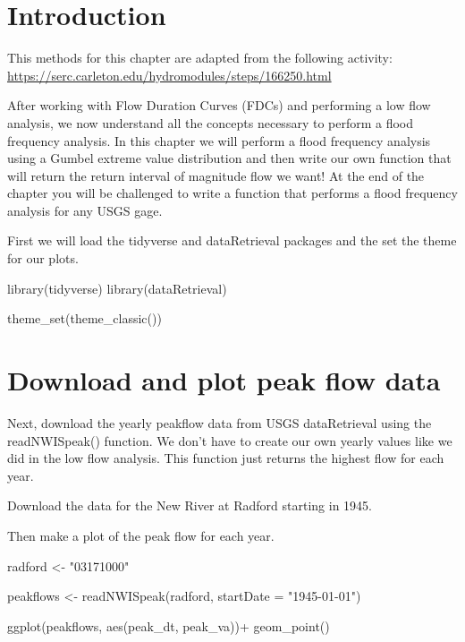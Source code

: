 \documentclass[
]{book}
\newenvironment{Shaded}{\begin{snugshade}}{\end{snugshade}}
\newcommand{\AttributeTok}[1]{\textcolor[rgb]{0.77,0.63,0.00}{#1}}
\newcommand{\FunctionTok}[1]{\textcolor[rgb]{0.00,0.00,0.00}{#1}}
\newcommand{\NormalTok}[1]{#1}
\newcommand{\OtherTok}[1]{\textcolor[rgb]{0.56,0.35,0.01}{#1}}
\newcommand{\SpecialCharTok}[1]{\textcolor[rgb]{0.00,0.00,0.00}{#1}}
\newcommand{\StringTok}[1]{\textcolor[rgb]{0.31,0.60,0.02}{#1}}
\begin{document}
\hypertarget{introduction-2}{%
\section{Introduction}\label{introduction-2}}

This methods for this chapter are adapted from the following activity:
\url{https://serc.carleton.edu/hydromodules/steps/166250.html}

After working with Flow Duration Curves (FDCs) and performing a low flow analysis, we now understand all the concepts necessary to perform a flood frequency analysis. In this chapter we will perform a flood frequency analysis using a Gumbel extreme value distribution and then write our own function that will return the return interval of magnitude flow we want! At the end of the chapter you will be challenged to write a function that performs a flood frequency analysis for any USGS gage.

First we will load the tidyverse and dataRetrieval packages and the set the theme for our plots.

\begin{Shaded}
\begin{Highlighting}[]
\FunctionTok{library}\NormalTok{(tidyverse)}
\FunctionTok{library}\NormalTok{(dataRetrieval)}

\FunctionTok{theme\_set}\NormalTok{(}\FunctionTok{theme\_classic}\NormalTok{())}
\end{Highlighting}
\end{Shaded}

\hypertarget{download-and-plot-peak-flow-data}{%
\section{Download and plot peak flow data}\label{download-and-plot-peak-flow-data}}

Next, download the yearly peakflow data from USGS dataRetrieval using the readNWISpeak() function. We don't have to create our own yearly values like we did in the low flow analysis. This function just returns the highest flow for each year.

Download the data for the New River at Radford starting in 1945.

Then make a plot of the peak flow for each year.

\begin{Shaded}
\begin{Highlighting}[]
\NormalTok{radford }\OtherTok{\textless{}{-}} \StringTok{"03171000"}

\NormalTok{peakflows }\OtherTok{\textless{}{-}} \FunctionTok{readNWISpeak}\NormalTok{(radford, }\AttributeTok{startDate =} \StringTok{"1945{-}01{-}01"}\NormalTok{)}

\FunctionTok{ggplot}\NormalTok{(peakflows, }\FunctionTok{aes}\NormalTok{(peak\_dt, peak\_va))}\SpecialCharTok{+}
  \FunctionTok{geom\_point}\NormalTok{()}
\end{Highlighting}
\end{Shaded}
\end{document}
